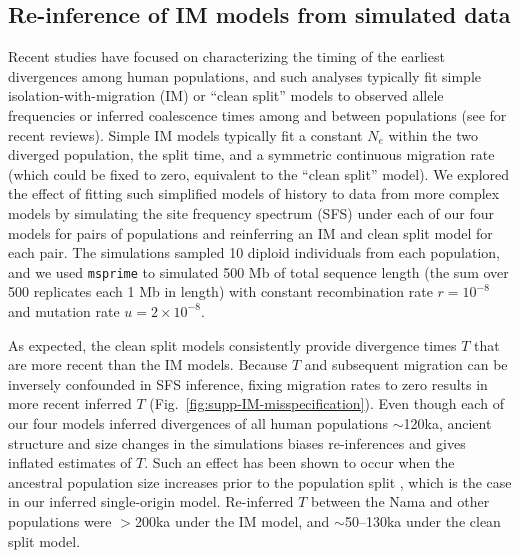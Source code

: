 \documentclass[]{article}
\newcommand{\msprime}{\texttt{msprime}\xspace}
\begin{document}
\subsection{Re-inference of IM models from simulated data}
\label{sec:IM-reinfer}

Recent studies have focused on characterizing the timing of the earliest
divergences among human populations, and such analyses
typically fit simple isolation-with-migration (IM) or ``clean split'' models to
observed allele frequencies or inferred coalescence times among and between
populations (see \citet{Weaver2008-ho,Bergstrom2021-iw} for recent reviews).
Simple IM models
typically fit a constant $N_e$ within the two diverged population, the split
time, and a symmetric continuous migration rate (which could be fixed to zero,
equivalent to the ``clean split'' model). We explored the effect of fitting
such simplified models of history to data from more complex models by
simulating the site frequency spectrum (SFS) under each of our four models for
pairs of populations and reinferring an IM and clean split model for each pair.
The simulations sampled 10 diploid individuals from each
population, and we used \msprime \citep{Baumdicker2022-mj} to simulated
500 Mb of total sequence length (the sum over 500 replicates each 1 Mb in length)
with constant recombination rate $r=10^{-8}$ and mutation rate $u=2\times10^{-8}.$

As expected, the clean split models consistently provide divergence times $T$
that are more recent than the IM models. Because $T$ and subsequent migration
can be inversely confounded in SFS inference, fixing migration rates to zero
results in more recent inferred $T$ (Fig.~\ref{fig:supp-IM-misspecification}).
Even though each of our four models inferred divergences of all human
populations $\sim$120ka, ancient structure and size changes in the simulations
biases re-inferences and gives inflated estimates of $T$.
Such an effect has been shown to occur when the ancestral
population size increases prior to the population split
\citep{Momigliano2021-th}, which is the case in our inferred single-origin model.
Re-inferred $T$ between the Nama and other populations were $>$200ka under the IM model,
and $\sim$50--130ka under the clean split model.





\clearpage

\end{document}
